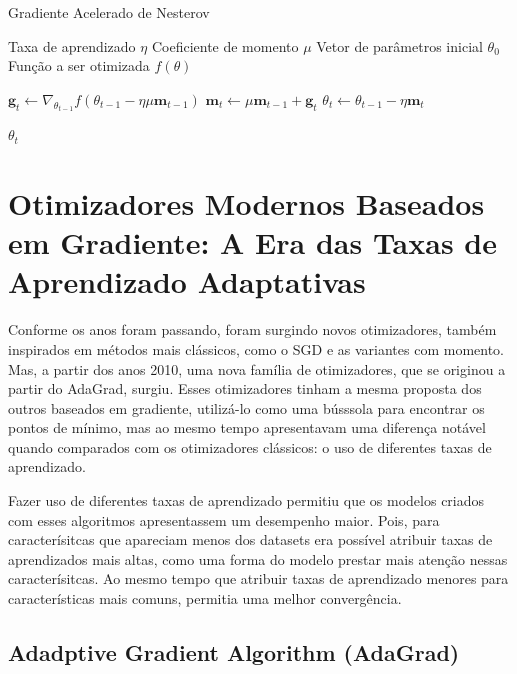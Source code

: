 \begin{algorithm}[H] %
    \caption{Gradiente Acelerado de Nesterov}
    \label{alg:gradiente-acelerado-de-nesterov}
    \begin{algorithmic}[1] %

    \Require Taxa de aprendizado $\eta$
    \Require Coeficiente de momento $\mu$
    \Require Vetor de parâmetros inicial $\theta_0$
    \Require Função a ser otimizada $f(\theta)$

        \State $\textbf{g}_t \leftarrow \nabla_{\theta_{t-1}} f(\theta_{t -1} - \eta \mu \textbf{m}_{t-1})$
        \State $\textbf{m}_t \leftarrow \mu \textbf{m}_{t-1} + \textbf{g}_t$
        \State $\theta_t \leftarrow \theta_{t-1} - \eta \textbf{m}_t$
    \EndWhile

    \State \Return $\theta_t$ 
    \end{algorithmic}
\end{algorithm}

\section{Otimizadores Modernos Baseados em Gradiente: A Era das Taxas de Aprendizado Adaptativas}

Conforme os anos foram passando, foram surgindo novos otimizadores, também inspirados em métodos mais clássicos, como o SGD e as variantes com momento. Mas, a partir dos anos 2010, uma nova família de otimizadores, que se originou a partir do AdaGrad, surgiu. Esses otimizadores tinham a mesma proposta dos outros baseados em gradiente, utilizá-lo como uma bússsola para encontrar os pontos de mínimo, mas ao mesmo tempo apresentavam uma diferença notável quando comparados com os otimizadores clássicos: o uso de diferentes taxas de aprendizado.

Fazer uso de diferentes taxas de aprendizado permitiu que os modelos criados com esses algoritmos apresentassem um desempenho maior. Pois, para caracterísitcas que apareciam menos dos datasets era possível atribuir taxas de aprendizados mais altas, como uma forma do modelo prestar mais atenção nessas caracterísitcas. Ao mesmo tempo que atribuir taxas de aprendizado menores para características mais comuns, permitia uma melhor convergência.

\subsection{Adadptive Gradient Algorithm (AdaGrad)}

